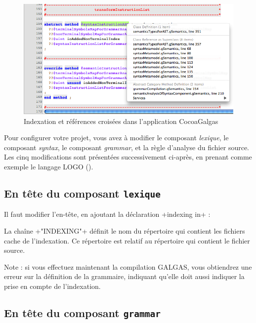 \begin{figure}[!t]
  \centering
  \includegraphics[width=14cm]{chapitre-cocoa-features/indexing-sample.png}
  \caption{Indexation et références croisées dans l'application CocoaGalgas}
  \ligne
\end{figure}

Pour configurer votre projet, vous avez à modifier le composant \emph{lexique}, le composant \emph{syntax}, le composant \emph{grammar}, et la règle d'analyse du fichier source. Les cinq modifications sont présentées successivement ci-après, en prenant comme exemple le langage LOGO ().





\subsection{En tête du composant \texttt{lexique}}

Il faut modifier l'en-tête, en ajoutant la déclaration  \ggs+indexing in+ :


\begin{galgas}
lexique logo_lexique indexing in "INDEXING" {
  ...
\end{galgas}

La chaîne \ggs+"INDEXING"+ définit le nom du répertoire qui contient les fichiers cache de l'indexation. Ce répertoire est relatif au répertoire qui contient le fichier source.

Note : si vous effectuez maintenant la compilation GALGAS, vous obtiendrez une erreur sur la définition de la grammaire, indiquant qu'elle doit aussi indiquer la prise en compte de l'indexation.




\subsection{En tête du composant \texttt{grammar}}

